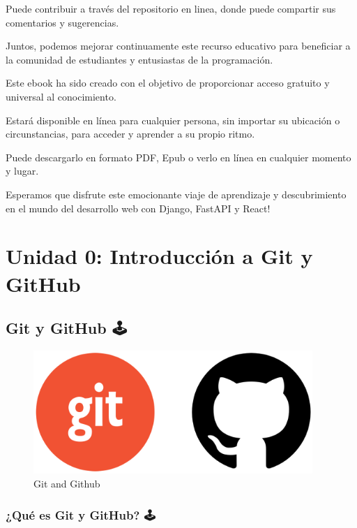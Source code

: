 \documentclass[
  a4paper,
  DIV=11,
  numbers=noendperiod,
  onepage,
  openany]{scrreprt}
\begin{document}
Puede contribuir a través del repositorio en linea, donde puede
compartir sus comentarios y sugerencias.

Juntos, podemos mejorar continuamente este recurso educativo para
beneficiar a la comunidad de estudiantes y entusiastas de la
programación.

Este ebook ha sido creado con el objetivo de proporcionar acceso
gratuito y universal al conocimiento.

Estará disponible en línea para cualquier persona, sin importar su
ubicación o circunstancias, para acceder y aprender a su propio ritmo.

Puede descargarlo en formato PDF, Epub o verlo en línea en cualquier
momento y lugar.

Esperamos que disfrute este emocionante viaje de aprendizaje y
descubrimiento en el mundo del desarrollo web con Django, FastAPI y
React!

\part{Unidad 0: Introducción a Git y GitHub}

\chapter{Git y GitHub 🕹️}\label{git-y-github}

\begin{figure}[H]

{\centering \includegraphics[width=4.16667in,height=\textheight,keepaspectratio]{unidades/unidad0/../../images/git_and_github.png}

}

\caption{Git and Github}

\end{figure}%

\section{¿Qué es Git y GitHub? 🕹️}\label{quuxe9-es-git-y-github}
\end{document}
